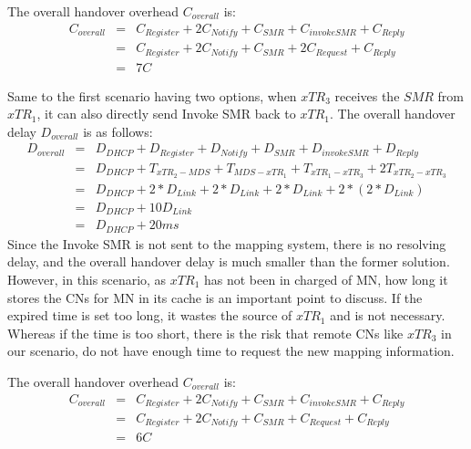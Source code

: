 The overall handover overhead $C_{overall}$ is:
\begin{eqnarray}
C_{overall} &=& C_{Register} + 2C_{Notify} + C_{SMR} + C_{invokeSMR} + C_{Reply} \nonumber \\
&=& C_{Register} + 2C_{Notify} + C_{SMR} + 2C_{Request} + C_{Reply} \nonumber \\
&=& 7 C
\end{eqnarray}

Same to the first scenario having two options, when $xTR_3$ receives the $SMR$ from $xTR_1$, it can also directly send Invoke SMR back to $xTR_1$. The overall handover delay $D_{overall}$ is as follows:
\begin{eqnarray}
D_{overall} &=& D_{DHCP} + D_{Register} + D_{Notify} + D_{SMR} + D_{invokeSMR} + D_{Reply} \nonumber \\
&=& D_{DHCP} + T_{xTR_2-MDS} + T_{MDS-xTR_1} + T_{xTR_1-xTR_3} + 2T_{xTR_2-xTR_3} \nonumber \\
&=& D_{DHCP} +2*D_{Link} + 2*D_{Link} + 2*D_{Link} + 2*(2*D_{Link}) \nonumber \\
&=& D_{DHCP} + 10D_{Link}  \\
&=& D_{DHCP} + 20 ms \nonumber
\end{eqnarray}
Since the Invoke SMR is not sent to the mapping system, there is no resolving delay, and the overall handover delay is much smaller than the former solution. However, in this scenario, as $xTR_1$ has not been in charged of MN, how long it stores the CNs for MN in its cache is an important point to discuss. If the expired time is set too long, it wastes the source of $xTR_1$ and is not necessary. Whereas if the time is too short, there is the risk that remote CNs like $xTR_3$ in our scenario, do not have enough time to request the new mapping information.

The overall handover overhead $C_{overall}$ is:
\begin{eqnarray}
C_{overall} &=& C_{Register} + 2C_{Notify} + C_{SMR} + C_{invokeSMR} + C_{Reply} \nonumber \\
&=& C_{Register} + 2C_{Notify} + C_{SMR} + C_{Request} + C_{Reply} \nonumber \\
&=& 6 C
\end{eqnarray}

